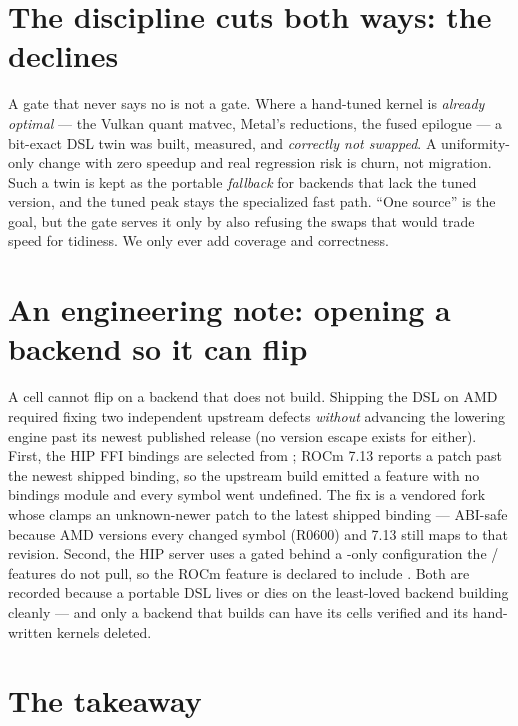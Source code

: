 \documentclass[11pt]{article}
\begin{document}
\section{The discipline cuts both ways: the declines}
\label{sec:declines}

A gate that never says no is not a gate. Where a hand-tuned kernel is \emph{already optimal} --- the
Vulkan quant matvec, Metal's  reductions, the fused  epilogue --- a
bit-exact DSL twin was built, measured, and \emph{correctly not swapped}. A uniformity-only change with
zero speedup and real regression risk is churn, not migration. Such a twin is kept as the portable
\emph{fallback} for backends that lack the tuned version, and the tuned peak stays the specialized fast
path. ``One source'' is the goal, but the gate serves it only by also refusing the swaps that would trade
speed for tidiness. We only ever add coverage and correctness.

\section{An engineering note: opening a backend so it can flip}
\label{sec:rocm}

A cell cannot flip on a backend that does not build. Shipping the DSL on AMD required fixing two
independent upstream defects \emph{without} advancing the lowering engine past its newest published
release (no version escape exists for either). First, the HIP FFI bindings are selected from
; ROCm 7.13 reports a patch past the newest shipped binding, so the upstream
build emitted a feature with no bindings module and every symbol went undefined. The fix is a vendored
 fork whose  clamps an unknown-newer patch to the latest shipped
binding --- ABI-safe because AMD versions every changed symbol (R0600) and 7.13 still maps
 to that revision. Second, the HIP server uses a  gated
behind a -only configuration the / features do not pull, so the ROCm feature
is declared to include . Both are recorded because a portable DSL lives or dies on the
least-loved backend building cleanly --- and only a backend that builds can have its cells verified and
its hand-written kernels deleted.

\section{The takeaway}
\end{document}
